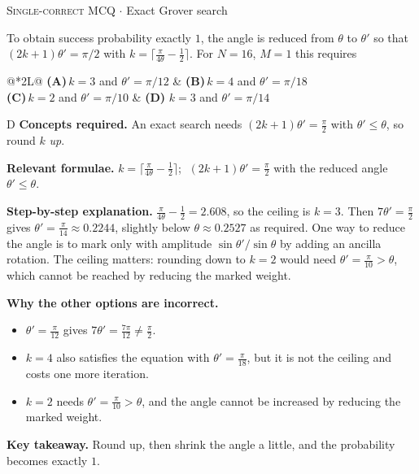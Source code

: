 \documentclass[11pt,a4paper]{article}
\newcommand{\optlabel}[1]{\textbf{(#1)}}
\newcommand{\correctlabel}[1]{\textcolor{okgreen}{\textbf{(#1)}\,\ding{51}}}
\newenvironment{qitem}[1]{\begin{list}{}{\setlength{\leftmargin}{3.3em}\setlength{\labelwidth}{3.1em}%
  \setlength{\labelsep}{0.2em}\setlength{\topsep}{3pt}\setlength{\parsep}{3pt}}\item[\textbf{Q.#1}\hfill]}{\end{list}}
\newcommand{\qsep}{\par\vspace{2pt}{\color{black!15}\hrule}\vspace{4pt}}
\newcommand{\qmeta}[2]{{\footnotesize\color{black!60}\textsc{#1} \;$\cdot$\; #2}\par}
\begin{document}
\begin{qitem}{63}
\qmeta{Single-correct MCQ}{Exact Grover search}
To obtain success probability exactly $1$, the angle is reduced from $\theta$ to $\theta'$ so that $(2k+1)\theta' = \pi/2$ with $k = \lceil\frac{\pi}{4\theta} - \frac12\rceil$. For $N = 16$, $M = 1$ this requires
\par\smallskip\noindent\begin{tabularx}{\linewidth}{@{}*{2}{L}@{}}
\optlabel{A}\,$k = 3$ and $\theta' = \pi/12$ & \optlabel{B}\,$k = 4$ and $\theta' = \pi/18$ \\[3pt]
\optlabel{C}\,$k = 2$ and $\theta' = \pi/10$ & \correctlabel{D}\,$k = 3$ and $\theta' = \pi/14$
\end{tabularx}
\end{qitem}
\begin{solbox}{D}
\textbf{\color{brand}Concepts required.} An exact search needs $(2k+1)\theta' = \frac\pi2$ with $\theta' \le \theta$, so round $k$ \emph{up}.

\textbf{\color{brand}Relevant formulae.} $k = \lceil\frac{\pi}{4\theta} - \frac12\rceil$; $\;(2k+1)\theta' = \frac\pi2$ with the reduced angle $\theta' \le \theta$.

\textbf{\color{brand}Step-by-step explanation.} $\frac{\pi}{4\theta} - \frac12 = 2.608$, so the ceiling is $k = 3$. Then $7\theta' = \frac\pi2$ gives $\theta' = \frac{\pi}{14} \approx 0.2244$, slightly below $\theta \approx 0.2527$ as required.
One way to reduce the angle is to mark only with amplitude $\sin\theta'/\sin\theta$ by adding an ancilla rotation. The ceiling matters: rounding down to $k = 2$ would need $\theta' = \frac{\pi}{10} > \theta$, which cannot be reached by reducing the marked weight.

\textbf{\color{brand}Why the other options are incorrect.}
\begin{itemize}[leftmargin=2.4em, itemsep=1pt, topsep=2pt]
\item[\textbf{(A)}] $\theta' = \frac{\pi}{12}$ gives $7\theta' = \frac{7\pi}{12} \ne \frac\pi2$.
\item[\textbf{(B)}] $k = 4$ also satisfies the equation with $\theta' = \frac{\pi}{18}$, but it is not the ceiling and costs one more iteration.
\item[\textbf{(C)}] $k = 2$ needs $\theta' = \frac{\pi}{10} > \theta$, and the angle cannot be increased by reducing the marked weight.
\end{itemize}
\textbf{\color{brand}Key takeaway.} Round up, then shrink the angle a little, and the probability becomes exactly $1$.
\end{solbox}
\qsep
\end{document}

